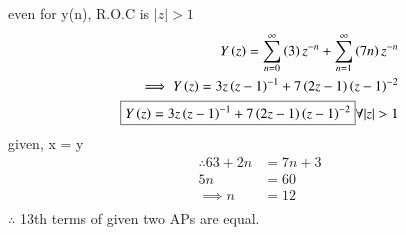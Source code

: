 \documentclass[journal,12pt,twocolumn]{IEEEtran}
\theoremstyle{remark}
\begin{document}
\begin{enumerate}
\begin{enumerate}
even for y(n), R.O.C is $ |z|>1$\\
\begin{align}
Y\brak{z} = \sum_{n=0}^{\infty} \brak{3}z^{-n}+\sum_{n=1}^{\infty}\brak{7n}z^{-n}\\
\implies Y\brak{z} = 3z\brak{z-1}^{-1} + 7\brak{2z-1}\brak{z-1}^{-2}\\
\boxed{Y\brak{z} = 3z\brak{z-1}^{-1} + 7\brak{2z-1}\brak{z-1}^{-2}} \forall  |z|>1 \label{eq:6}
\end{align}
given, x = y\\
\begin{align}
\therefore 63 + 2n &= 7n+3\\
5n &= 60\\
\implies n &= 12\\
\end{align}
$ \therefore$ 13th terms of given two APs are equal.\\\\
\end{enumerate}
\end{enumerate}
\end{document}
